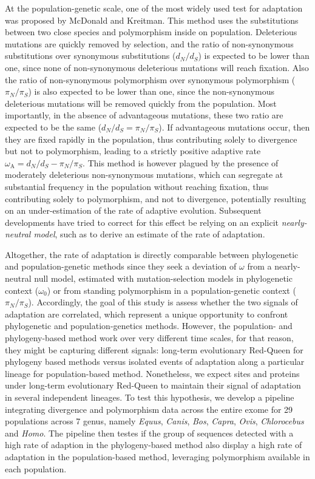 \documentclass{article}
\newcommand{\dn}{d_N}
\newcommand{\ds}{d_S}
\newcommand{\dnds}{\dn / \ds}
\newcommand{\pn}{\pi_N}
\newcommand{\ps}{\pi_S}
\newcommand{\pnps}{\pn / \ps}
\begin{document}
At the population-genetic scale, one of the most widely used test for adaptation was proposed by McDonald and Kreitman\cite{mcdonald_adaptative_1991}.
This method uses the substitutions between two close species and polymorphism inside on population.
Deleterious mutations are quickly removed by selection, and the ratio of non-synonymous substitutions over synonymous substitutions ($\dnds$) is expected to be lower than one, since none of non-synonymous deleterious mutations will reach fixation.
Also the ratio of non-synonymous polymorphism over synonymous polymorphism ($\pnps$) is also expected to be lower than one, since the non-synonymous deleterious mutations will be removed quickly from the population.
Most importantly, in the absence of advantageous mutations, these two ratio are expected to be the same ($\dnds=\pnps$).
If advantageous mutations occur, then they are fixed rapidly in the population, thus contributing solely to divergence but not to polymorphism, leading to a strictly positive adaptive rate $\omega_{\mathrm{A}} = \dnds-\pnps$\cite{smith_adaptive_2002}.
This method is however plagued by the presence of moderately deleterious non-synonymous mutations, which can segregate at substantial frequency in the population without reaching fixation, thus contributing solely to polymorphism, and not to divergence, potentially resulting on an under-estimation of the rate of adaptive evolution\cite{eyre-walker_quantifying_2002}.
Subsequent developments have tried to correct for this effect be relying on an explicit \textit{nearly-neutral model}, such as to derive an estimate of the rate of adaptation\cite{eyre-walker_estimating_2009, galtier_adaptive_2016}.

Altogether, the rate of adaptation is directly comparable between phylogenetic and population-genetic methods since they seek a deviation of $\omega$ from a nearly-neutral null model, estimated with mutation-selection models in phylogenetic context ($\omega_{0}$) or from standing polymorphism in a population-genetic context ($\pnps$).
Accordingly, the goal of this study is assess whether the two signals of adaptation are correlated, which represent a unique opportunity to confront phylogenetic and population-genetics methods.
However, the population- and phylogeny-based method work over very different time scales, for that reason, they might be capturing different signals: long-term evolutionary Red-Queen for phylogeny based methods versus isolated events of adaptation along a particular lineage for population-based method.
Nonetheless, we expect sites and proteins under long-term evolutionary Red-Queen to maintain their signal of adaptation in several independent lineages.
To test this hypothesis, we develop a pipeline integrating divergence and polymorphism data across the entire exome for 29 populations across 7 genus, namely \textit{Equus}, \textit{Canis}, \textit{Bos}, \textit{Capra}, \textit{Ovis}, \textit{Chlorocebus} and \textit{Homo}.
The pipeline then testes if the group of sequences detected with a high rate of adaption in the phylogeny-based method also display a high rate of adaptation in the population-based method, leveraging polymorphism available in each population.
\end{document}

